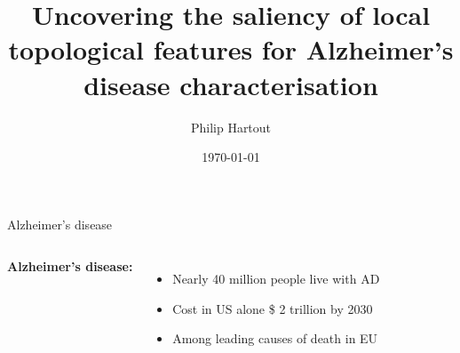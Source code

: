\documentclass[aspectratio=169, 10pt, dvipsnames]{beamer}
\title{Uncovering the saliency of local topological features for Alzheimer's disease characterisation}
\date{\today}
\author{Philip Hartout}
\begin{document}
\maketitle


\begin{frame}[fragile]{Alzheimer's disease}

  \begin{columns}[T,onlytextwidth]
    \textbf{Alzheimer's disease:} \brain
    \begin{itemize}
    \item Nearly 40 million people live with AD
    \item Cost in US alone \$ 2 trillion by 2030
    \item Among leading causes of death in EU
    \end{itemize}
\end{columns}
\end{frame}
\end{document}
